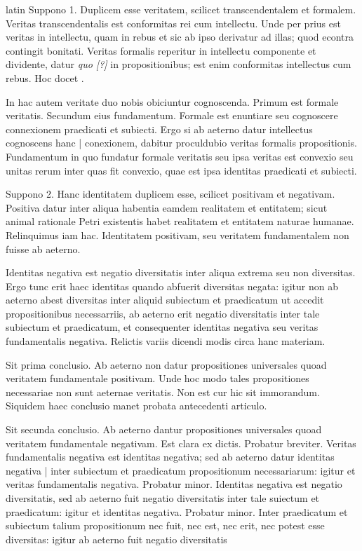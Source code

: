 \begin{otherlanguage*}{latin}
\pstart
Suppono 1. Duplicem esse veritatem, scilicet transcendentalem et formalem. Veritas transcendentalis est conformitas rei cum intellectu. Unde per prius est veritas in intellectu, quam in rebus et sic ab ipso derivatur ad illas; quod econtra contingit bonitati. Veritas formalis reperitur in intellectu componente et dividente, datur \emph{quo [?]} in propositionibus; est enim conformitas intellectus cum rebus. Hoc docet . 
\pend

\pstart
In hac autem veritate duo nobis obiciuntur cognoscenda. Primum est formale veritatis. Secundum eius fundamentum. Formale est enuntiare seu cognoscere connexionem praedicati et subiecti. Ergo si ab aeterno datur intellectus cognoscens hanc \textnormal{|} conexionem, dabitur proculdubio veritas formalis propositionis. Fundamentum in quo fundatur formale veritatis seu ipsa veritas est convexio seu unitas rerum inter quas fit convexio, quae est ipsa identitas praedicati et subiecti. 
\pend

\pstart
Suppono 2. Hanc identitatem duplicem esse, scilicet positivam et negativam. Positiva datur inter aliqua habentia eamdem realitatem et entitatem; sicut animal rationale Petri existentis habet realitatem et entitatem naturae humanae. Relinquimus iam hac. Identitatem positivam, seu veritatem fundamentalem non fuisse ab aeterno. 
\pend

\pstart
Identitas negativa est negatio diversitatis inter aliqua extrema seu non diversitas. Ergo tunc erit haec identitas quando abfuerit diversitas negata:
igitur non ab aeterno abest diversitas inter aliquid subiectum et praedicatum ut accedit propositionibus necessarriis, ab aeterno erit negatio diversitatis inter tale subiectum et praedicatum, et consequenter identitas negativa seu veritas fundamentalis negativa. Relictis variis dicendi modis circa hanc materiam. 
\pend

\pstart
Sit prima conclusio. Ab aeterno non datur propositiones universales quoad veritatem fundamentale positivam. Unde hoc modo tales propositiones necessariae non sunt aeternae veritatis. Non est cur hic sit immorandum. Siquidem haec conclusio manet probata antecedenti articulo. 
\pend

\pstart
Sit secunda conclusio. Ab aeterno dantur propositiones universales quoad veritatem fundamentale negativam. Est clara ex dictis. Probatur breviter. Veritas fundamentalis negativa est identitas negativa; sed ab aeterno datur identitas negativa \textnormal{|} inter subiectum et praedicatum propositionum necessariarum:
igitur et veritas fundamentalis negativa. Probatur minor. Identitas negativa est negatio diversitatis, sed ab aeterno fuit negatio diversitatis inter tale suiectum et praedicatum:
igitur et identitas negativa. Probatur minor. Inter praedicatum et subiectum talium propositionum nec fuit, nec est, nec erit, nec potest esse diversitas:
igitur ab aeterno fuit negatio diversitatis 
\pend


\end{otherlanguage*}
